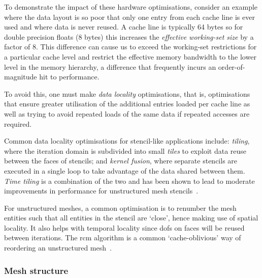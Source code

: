 To demonstrate the impact of these hardware optimisations, consider an example where the data layout is so poor that only one entry from each cache line is ever used and where data is never reused.
A cache line is typically 64 bytes so for double precision floats (8 bytes) this increases the \textit{effective working-set size} by a factor of 8.
This difference can cause us to exceed the working-set restrictions for a particular cache level and restrict the effective memory bandwidth to the lower level in the memory hierarchy, a difference that frequently incurs an order-of-magnitude hit to performance.

To avoid this, one must make \textit{data locality} optimisations, that is, optimisations that ensure greater utilisation of the additional entries loaded per cache line as well as trying to avoid repeated loads of the same data if repeated accesses are required.

Common data locality optimisations for stencil-like applications include: \textit{tiling}, where the iteration domain is subdivided into small \textit{tiles} to exploit data reuse between the faces of stencils; and \textit{kernel fusion}, where separate stencils are executed in a single loop to take advantage of the data shared between them.  %
\textit{Time tiling} is a combination of the two and has been shown to lead to moderate improvements in performance for unstructured mesh stencils~\cite{luporiniAutomatedTilingUnstructured2019}.

For unstructured meshes, a common optimisation is to renumber the mesh entities such that all entities in the stencil are `close', hence making use of spatial locality.
It also helps with temporal locality since \glspl{dof} on faces will be reused between iterations.
The \gls{rcm} algorithm is a common `cache-oblivious' way of reordering an unstructured mesh~\cite{cuthillReducingBandwidthSparse1969,langeEfficientMeshManagement2016}.

\subsubsection{Mesh structure}
\label{sec:background_structure}

